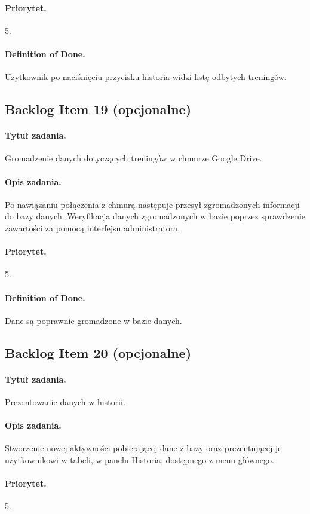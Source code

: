 \documentclass[a4paper]{article}
\begin{document}
\paragraph{Priorytet.} 5.
\paragraph{Definition of Done.} Użytkownik po naciśnięciu przycisku historia widzi listę odbytych treningów.

\subsection{Backlog Item 19 (opcjonalne)}
\paragraph{Tytuł zadania.} Gromadzenie danych dotyczących treningów w chmurze Google Drive.
\paragraph{Opis zadania.} Po nawiązaniu połączenia z chmurą następuje przesył zgromadzonych informacji do bazy danych. Weryfikacja danych zgromadzonych w bazie poprzez sprawdzenie zawartości za pomocą interfejsu administratora.
\paragraph{Priorytet.} 5.
\paragraph{Definition of Done.} Dane są poprawnie gromadzone w bazie danych.

\subsection{Backlog Item 20 (opcjonalne)}
\paragraph{Tytuł zadania.} Prezentowanie danych w historii.
\paragraph{Opis zadania.} Stworzenie nowej aktywności pobierającej dane z bazy oraz prezentującej je użytkownikowi w tabeli, w panelu Historia, dostępnego z menu głównego.
\paragraph{Priorytet.} 5.
\end{document}
